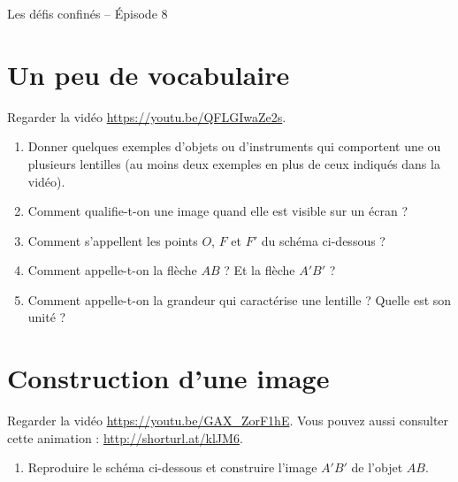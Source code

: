 \documentclass[12pt,a4paper,fleqn]{article}
\newcommand{\width}{16}
\newcommand{\height}{5}
\begin{document}
\begin{header}
Les défis confinés -- Épisode 8
\end{header}

\section*{Un peu de vocabulaire}

Regarder la vidéo \href{https://youtu.be/QFLGIwaZe2s}{https://youtu.be/QFLGIwaZe2s}.
\begin{enumerate}
\item Donner quelques exemples d'objets ou d'instruments qui comportent une ou plusieurs lentilles (au moins deux exemples en plus de ceux indiqués dans la vidéo).
\item Comment qualifie-t-on une image quand elle est visible sur un écran ?
\item Comment s'appellent les points $O$, $F$ et $F'$ du schéma ci-dessous ?
\item Comment appelle-t-on la flèche $AB$ ?
Et la flèche $A'B'$ ?
\item Comment appelle-t-on la grandeur qui caractérise une lentille ?
Quelle est son unité ?
\end{enumerate}

\begin{center}
\end{center}


\section*{Construction d'une image}

Regarder la vidéo \href{https://youtu.be/GAX\_ZorF1hE}{https://youtu.be/GAX\_ZorF1hE}.
Vous pouvez aussi consulter cette animation : \href{http://shorturl.at/klJM6}{http://shorturl.at/klJM6}.
\begin{enumerate}[resume]
\item Reproduire le schéma ci-dessous et construire l'image $A'B'$ de l'objet $AB$.
\end{enumerate}
\end{document}
